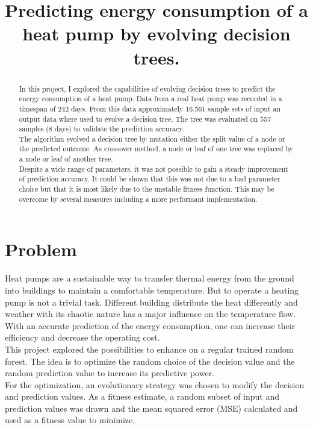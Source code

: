 \documentclass[conference]{IEEEtran}
\begin{document}
\title{Predicting energy consumption of a heat pump
by evolving decision trees.}

\author{
}

\maketitle


\begin{abstract}
In this project, I explored the capabilities of evolving decision trees to predict the energy consumption of a heat pump. Data from a real heat pump was recorded in a timespan of 242 days. From this data approximately 16.561 sample sets of input an output data where used to evolve a decision tree. The tree was evaluated on 557 samples (8 days) to validate the prediction accuracy.\\
The algorithm evolved a decision tree by mutation either the split value of a node or the predicted outcome. As crossover method, a node or leaf of one tree was replaced by a node or leaf of another tree.\\
Despite a wide range of parameters, it was not possible to gain a steady improvement of prediction accuracy. It could be shown that this was not due to a bad parameter choice but that it is most likely due to the unstable  fitness function. This may be overcome by several measures including a more performant implementation.
\end{abstract}
\IEEEpeerreviewmaketitle



\section{Problem}

Heat pumps are a sustainable way to transfer thermal energy from the ground into buildings to maintain a comfortable temperature. But to operate a heating pump is not a trivial task. Different building distribute the heat differently and weather with its chaotic nature has a major influence on the temperature flow. With an accurate prediction of the energy consumption, one can increase their efficiency and decrease the operating cost.\\
This project explored the possibilities to enhance on a regular trained random forest. The idea is to optimize the random choice of the decision value and the random prediction value to increase its predictive power.\\
For the optimization, an evolutionary strategy was chosen to modify the decision and prediction values. As a fitness estimate, a random subset of input and prediction values was drawn and the mean squared error (MSE) calculated and used as a fitness value to minimize. 
\end{document}
